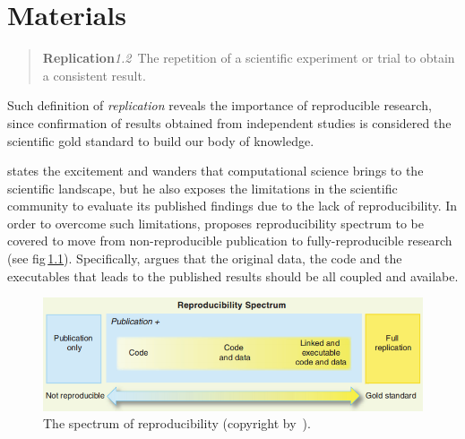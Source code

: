 \graphicspath{{4_materials/figures/}}
\chapter{Materials}\label{chap:4}

\begin{quote}
  \textbf{Replication}\quad \emph{1.2}~The repetition of a scientific
  experiment or trial to obtain a consistent result.
\end{quote}

Such definition of \emph{replication} reveals the importance of reproducible research, since confirmation of results obtained from independent studies is considered the scientific gold standard to build our body of knowledge.

\citeauthor{peng2011reproducible} states the excitement and wanders that computational science brings to the scientific landscape, but he also exposes the limitations in the scientific community to evaluate its published findings due to the lack of reproducibility.
In order to overcome such limitations, \citeauthor{peng2011reproducible} proposes reproducibility spectrum to be covered to move from non-reproducible publication to fully-reproducible research (see \acs{fig}\,\ref{fig:reproducibility_spectrum}).
Specifically, \citeauthor{peng2011reproducible} argues that the original data, the code and the executables that leads to the published results should be all coupled and  availabe. 

\begin{figure}
\centering
\includegraphics[width=.7\textwidth]{reproducibility_spectrum}
\caption[The spectrum of reproducibility.]{The spectrum of reproducibility (copyright by~\cite{peng2011reproducible}).}
\label{fig:reproducibility_spectrum}
\end{figure}


